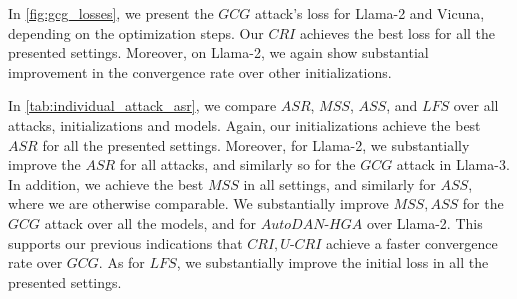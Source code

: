 In \cref{fig:gcg_losses}, we present the $GCG$ attack’s loss for Llama-2 and Vicuna, depending on the optimization steps. Our $CRI$ achieves the best loss for all the presented settings. Moreover, on Llama-2, we again show substantial improvement in the convergence rate over other initializations.


In \cref{tab:individual_attack_asr}, we compare $ASR$, $MSS$, $ASS$, and $LFS$ over all attacks, initializations and models. Again, our initializations achieve the best $ASR$ for all the presented settings. Moreover, for Llama-2, we substantially improve the $ASR$ for all attacks, and similarly so for the $GCG$ attack in Llama-3. In addition, we achieve the best $MSS$ in all settings, and similarly for $ASS$, where we are otherwise comparable. We substantially improve $MSS,ASS$ for the $GCG$ attack over all the models, and for $AutoDAN\text{-}HGA$ over Llama-2. This supports our previous indications that $CRI,U\text{-}CRI$ achieve a faster convergence rate over $GCG$. As for $LFS$, we substantially improve the initial loss in all the presented settings.





